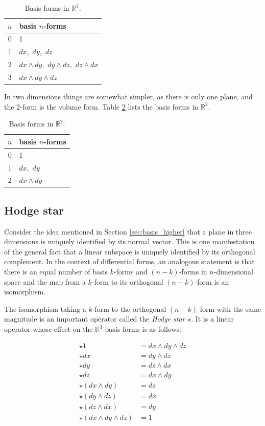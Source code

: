 \documentclass[utf8,english]{gradu3}
\begin{document}
\begin{table}[h]
  \begin{tabular}{c | l}
    $n$ & basis $n$-forms \\
    \hline
    0 & 1 \\
    1 & $dx$,\, $dy$,\, $dz$ \\
    2 & $dx \wedge dy$,\, $dy \wedge dz$,\, $dz \wedge dx$ \\
    3 & $dx \wedge dy \wedge dz$ \\
  \end{tabular}
  \caption{Basis forms in $\mathbb{R}^3$.}
  \label{tab:basis_3d}
\end{table}

In two dimensions things are somewhat simpler,
as there is only one plane, and the 2-form is the volume form.
Table \ref{tab:basis_2d} lists the basis forms in $\mathbb{R}^2$.

\begin{table}[h]
  \begin{tabular}{c | l}
    $n$ & basis $n$-forms \\
    \hline
    0 & 1 \\
    1 & $dx$,\, $dy$ \\
    2 & $dx \wedge dy$ \\
  \end{tabular}
  \caption{Basis forms in $\mathbb{R}^2$.}
  \label{tab:basis_2d}
\end{table}

\subsection{Hodge star}\label{sec:hodge}

Consider the idea mentioned in Section \ref{sec:basis_higher}
that a plane in three dimensions is uniquely identified by its normal vector.
This is one manifestation of the general fact that a linear subspace
is uniquely identified by its orthogonal complement.
In the context of differential forms,
an analogous statement is that there is an equal number
of basis $k$-forms and $(n-k)$-forms in $n$-dimensional space
and the map from a $k$-form to its orthogonal $(n-k)$-form
is an isomorphism.

The isomorphism taking a $k$-form to the orthogonal $(n-k)$-form
with the same magnitude is an important operator
called the \textit{Hodge star} $\star$.
It is a linear operator whose effect on the $\mathbb{R}^3$ basis forms
is as follows:

\begin{align*}
  \star 1 &= dx \wedge dy \wedge dz \\
  \star dx &= dy \wedge dz \\
  \star dy &= dz \wedge dx \\
  \star dz &= dx \wedge dy \\
  \star (dx \wedge dy) &= dz \\
  \star (dy \wedge dz) &= dx \\
  \star (dz \wedge dx) &= dy \\
  \star (dx \wedge dy \wedge dz) &= 1 \\
\end{align*}
\end{document}
